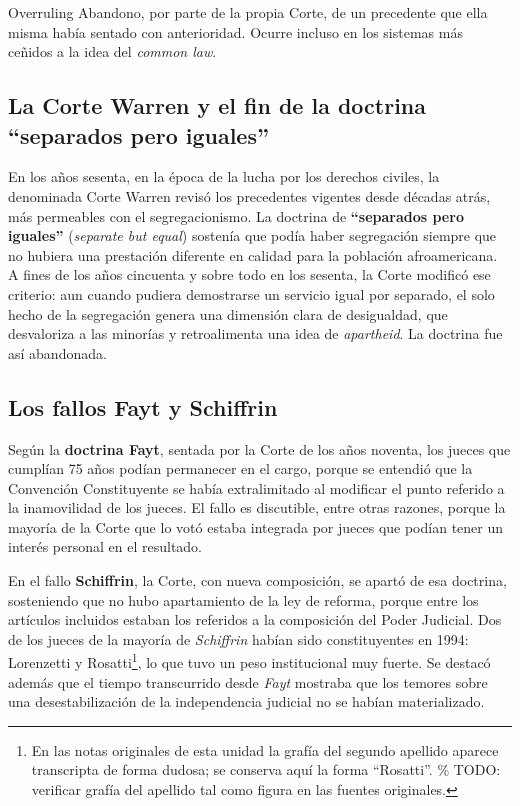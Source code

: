 \documentclass[12pt,oneside]{book}
\begin{document}
\begin{definition}{Overruling}
Abandono, por parte de la propia Corte, de un precedente que ella misma había sentado con anterioridad. Ocurre incluso en los sistemas más ceñidos a la idea del \emph{common law}.
\end{definition}

\subsection{La Corte Warren y el fin de la doctrina ``separados pero iguales''}

En los años sesenta, en la época de la lucha por los derechos civiles, la denominada Corte Warren revisó los precedentes vigentes desde décadas atrás, más permeables con el segregacionismo. La doctrina de \textbf{``separados pero iguales''} (\emph{separate but equal}) sostenía que podía haber segregación siempre que no hubiera una prestación diferente en calidad para la población afroamericana. A fines de los años cincuenta y sobre todo en los sesenta, la Corte modificó ese criterio: aun cuando pudiera demostrarse un servicio igual por separado, el solo hecho de la segregación genera una dimensión clara de desigualdad, que desvaloriza a las minorías y retroalimenta una idea de \emph{apartheid}. La doctrina fue así abandonada.

\subsection{Los fallos Fayt y Schiffrin}

Según la \textbf{doctrina Fayt}, sentada por la Corte de los años noventa, los jueces que cumplían 75 años podían permanecer en el cargo, porque se entendió que la Convención Constituyente se había extralimitado al modificar el punto referido a la inamovilidad de los jueces. El fallo es discutible, entre otras razones, porque la mayoría de la Corte que lo votó estaba integrada por jueces que podían tener un interés personal en el resultado.

En el fallo \textbf{Schiffrin}, la Corte, con nueva composición, se apartó de esa doctrina, sosteniendo que no hubo apartamiento de la ley de reforma, porque entre los artículos incluidos estaban los referidos a la composición del Poder Judicial. Dos de los jueces de la mayoría de \emph{Schiffrin} habían sido constituyentes en 1994: Lorenzetti y Rosatti\footnote{En las notas originales de esta unidad la grafía del segundo apellido aparece transcripta de forma dudosa; se conserva aquí la forma ``Rosatti''. \% TODO: verificar grafía del apellido tal como figura en las fuentes originales.}, lo que tuvo un peso institucional muy fuerte. Se destacó además que el tiempo transcurrido desde \emph{Fayt} mostraba que los temores sobre una desestabilización de la independencia judicial no se habían materializado.
\end{document}

